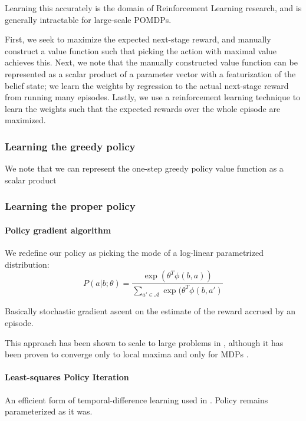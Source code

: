 \documentclass[runningheads]{llncs}
\begin{document}
Learning this accurately is the domain of Reinforcement Learning research, and is generally intractable for large-scale POMDPs.

First, we seek to maximize the expected next-stage reward, and manually construct a value function such that picking the action with maximal value achieves this.
Next, we note that the manually constructed value function can be represented as a scalar product of a parameter vector with a featurization of the belief state; we learn the weights by regression to the actual next-stage reward from running many episodes.
Lastly, we use a reinforcement learning technique to learn the weights such that the expected rewards over the whole episode are maximized.

\subsubsection{Learning the greedy policy}
We note that we can represent the one-step greedy policy value function as a scalar product 

\subsubsection{Learning the proper policy}

\paragraph{Policy gradient algorithm}
We redefine our policy as picking the mode of a log-linear parametrized distribution:
\begin{equation}
P(a|b;\theta) = \frac{\exp(\theta^T \phi(b,a))}{\sum_{a' \in \mathcal{A}} \exp(\theta^T \phi(b,a')}
\end{equation}

Basically stochastic gradient ascent on the estimate of the reward accrued by an episode.

This approach has been shown to scale to large problems in \cite{Branavan2009}, although it has been proven to converge only to local maxima and only for MDPs \cite{Sutton2000}.


\paragraph{Least-squares Policy Iteration}
An efficient form of temporal-difference learning used in \cite{Kwok2004}.
Policy remains parameterized as it was.
\end{document}
